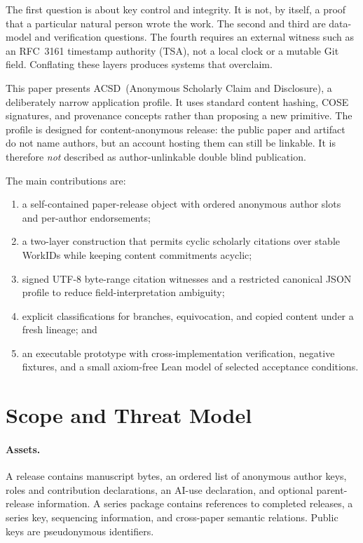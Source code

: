 \documentclass[11pt]{article}
\newcommand{\workid}{\textsf{WorkID}}
\newcommand{\acsd}{\textsc{ACSD}}
\begin{document}
The first question is about key control and integrity. It is not, by itself, a proof that a particular natural person wrote the work. The second and third are data-model and verification questions. The fourth requires an external witness such as an RFC~3161 timestamp authority (TSA), not a local clock or a mutable Git field. Conflating these layers produces systems that overclaim.

This paper presents \acsd\ (Anonymous Scholarly Claim and Disclosure), a deliberately narrow application profile. It uses standard content hashing, COSE signatures, and provenance concepts rather than proposing a new primitive. The profile is designed for content-anonymous release: the public paper and artifact do not name authors, but an account hosting them can still be linkable. It is therefore \emph{not} described as author-unlinkable double blind publication.

The main contributions are:

\begin{enumerate}
  \item a self-contained paper-release object with ordered anonymous author slots and per-author endorsements;
  \item a two-layer construction that permits cyclic scholarly citations over stable \workid s while keeping content commitments acyclic;
  \item signed UTF-8 byte-range citation witnesses and a restricted canonical JSON profile to reduce field-interpretation ambiguity;
  \item explicit classifications for branches, equivocation, and copied content under a fresh lineage; and
  \item an executable prototype with cross-implementation verification, negative fixtures, and a small axiom-free Lean model of selected acceptance conditions.
\end{enumerate}

\section{Scope and Threat Model}

\paragraph{Assets.} A release contains manuscript bytes, an ordered list of anonymous author keys, roles and contribution declarations, an AI-use declaration, and optional parent-release information. A series package contains references to completed releases, a series key, sequencing information, and cross-paper semantic relations. Public keys are pseudonymous identifiers.
\end{document}
